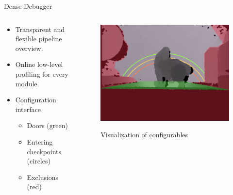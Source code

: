 \documentclass[final,hyperref={pdfpagelabels=false}]{beamer}
\begin{document}
\begin{frame}[t]
\begin{columns}[t]
\begin{column}{.465\textwidth}
\begin{block}{Dense Debugger}

\begin{columns} %
\begin{column}{.54\textwidth} %

\begin{itemize}
\item Transparent and flexible pipeline overview.
\item Online low-level profiling for every module.
\item Configuration interface

\begin{itemize}
\item Doors (green)
\item Entering checkpoints (circles)
\item Exclusions (red)
\end{itemize}
\end{itemize}

\end{column}

\begin{column}{.43\textwidth} %
\centering
\begin{figure}
\includegraphics[width=\linewidth]{PosterConfigCrop.png}
\label{fig:Config}
\caption{Visualization of configurables}
\end{figure}
\end{column}
\end{columns} %


\end{block}
\end{column}
\end{columns}
\end{frame}
\end{document}
